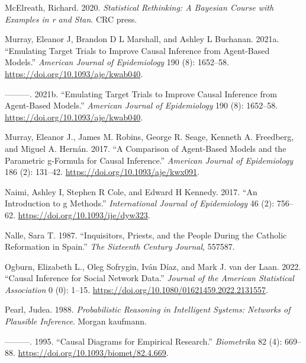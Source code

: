 \documentclass[
  singlecolumn]{report}
\newlength{\cslhangindent}
\newlength{\cslentryspacingunit} %
\newenvironment{CSLReferences}[2] %
 {%
  \setlength{\parindent}{0pt}
  \ifodd #1
  \let\oldpar\par
  \def\par{\hangindent=\cslhangindent\oldpar}
  \fi
  \setlength{\parskip}{#2\cslentryspacingunit}
 }%
 {}
\begin{document}
\begin{CSLReferences}{1}{0}
\leavevmode{}%
McElreath, Richard. 2020. \emph{Statistical Rethinking: A Bayesian
Course with Examples in r and Stan}. CRC press.

\leavevmode{}%
Murray, Eleanor J, Brandon D L Marshall, and Ashley L Buchanan. 2021a.
{``Emulating Target Trials to Improve Causal Inference from Agent-Based
Models.''} \emph{American Journal of Epidemiology} 190 (8): 1652--58.
\url{https://doi.org/10.1093/aje/kwab040}.

\leavevmode{}%
---------. 2021b. {``Emulating Target Trials to Improve Causal Inference
from Agent-Based Models.''} \emph{American Journal of Epidemiology} 190
(8): 1652--58. \url{https://doi.org/10.1093/aje/kwab040}.

\leavevmode{}%
Murray, Eleanor J., James M. Robins, George R. Seage, Kenneth A.
Freedberg, and Miguel A. Hernán. 2017. {``A Comparison of Agent-Based
Models and the Parametric g-Formula for Causal Inference.''}
\emph{American Journal of Epidemiology} 186 (2): 131--42.
\url{https://doi.org/10.1093/aje/kwx091}.

\leavevmode{}%
Naimi, Ashley I, Stephen R Cole, and Edward H Kennedy. 2017. {``An
Introduction to g Methods.''} \emph{International Journal of
Epidemiology} 46 (2): 756--62. \url{https://doi.org/10.1093/ije/dyw323}.

\leavevmode{}%
Nalle, Sara T. 1987. {``Inquisitors, Priests, and the People During the
Catholic Reformation in Spain.''} \emph{The Sixteenth Century Journal},
557587.

\leavevmode{}%
Ogburn, Elizabeth L., Oleg Sofrygin, Iván Díaz, and Mark J. van der
Laan. 2022. {``Causal Inference for Social Network Data.''}
\emph{Journal of the American Statistical Association} 0 (0): 1--15.
\url{https://doi.org/10.1080/01621459.2022.2131557}.

\leavevmode{}%
Pearl, Judea. 1988. \emph{Probabilistic Reasoning in Intelligent
Systems: Networks of Plausible Inference}. Morgan kaufmann.

\leavevmode{}%
---------. 1995. {``Causal Diagrams for Empirical Research.''}
\emph{Biometrika} 82 (4): 669--88.
\url{https://doi.org/10.1093/biomet/82.4.669}.


\end{CSLReferences}
\end{document}
